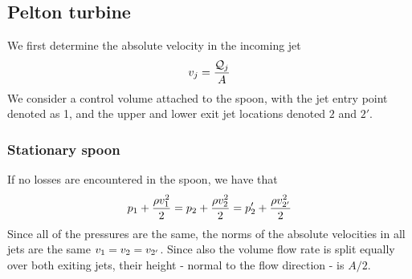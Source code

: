 
\subsection*{Pelton turbine}

We first determine the absolute velocity in the incoming jet
\begin{align*}
  v_j = \frac{\mathcal Q_j}{A}
\end{align*}
We consider a control volume attached to the spoon, with the jet entry
point denoted as 1, and the upper and lower exit jet locations denoted
$2$ and $2'$.

\subsubsection*{Stationary spoon}

If no losses are encountered in the spoon, we have that
\begin{align*}
  p_1 + \frac{\rho v_1^2}{2} = 
  p_2 + \frac{\rho v_{2}^2}{2} = 
  p_2' + \frac{\rho v_{2'}^2}{2}
\end{align*}
Since all of the pressures are the same, the norms of the absolute
velocities in all jets are the same $v_1 = v_{2} =
v_{2'}$. Since also the volume flow rate is split equally over
both exiting jets, their height - normal to the flow direction - is
$A/2$.

